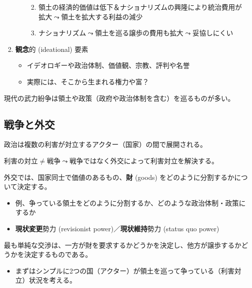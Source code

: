 \documentclass[
  xelatex,
  ja=standard]{bxjsarticle}
\providecommand{\tightlist}{%
  \setlength{\itemsep}{0pt}\setlength{\parskip}{0pt}}\usepackage{longtable,booktabs,array}
\begin{document}
\begin{enumerate}
\begin{itemize}
    \begin{enumerate}
    \def\labelenumii{\arabic{enumii}.}
    \tightlist
    \item
      領土の経済的価値は低下＆ナショナリズムの興隆により統治費用が拡大\(\leadsto\)領土を拡大する利益の減少
    \item
      ナショナリズム\(\leadsto\)領土を巡る譲歩の費用も拡大\(\leadsto\)妥協しにくい
    \end{enumerate}
  \end{itemize}
\item
  \textbf{観念}的 (ideational) 要素

  \begin{itemize}
  \tightlist
  \item
    イデオロギーや政治体制、価値観、宗教、評判や名誉
  \item
    実際には、そこから生まれる権力や富？
  \end{itemize}
\end{enumerate}

現代の武力紛争は領土や政策（政府や政治体制を含む）を巡るものが多い。

\hypertarget{ux6226ux4e89ux3068ux5916ux4ea4}{%
\subsection{戦争と外交}\label{ux6226ux4e89ux3068ux5916ux4ea4}}

政治は複数の利害が対立するアクター（国家）の間で展開される。

利害の対立\(\neq\)戦争\(\leadsto\)戦争ではなく外交によって利害対立を解決する。

外交では、国家同士で価値のあるもの、\textbf{財} (goods)
をどのように分割するかについて決定する。

\begin{itemize}
\tightlist
\item
  例、争っている領土をどのように分割するか、どのような政治体制・政策にするか
\item
  \textbf{現状変更}勢力 (revisionist power)／\textbf{現状維持}勢力
  (status quo power)
\end{itemize}

最も単純な交渉は、一方が財を要求するかどうかを決定し、他方が譲歩するかどうかを決定するものである。

\begin{itemize}
\tightlist
\item
  まずはシンプルに2つの国（アクター）が領土を巡って争っている（利害対立）状況を考える。
\end{itemize}
\end{document}
